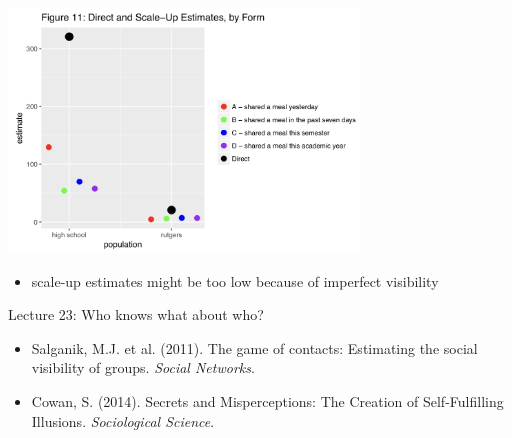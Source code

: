\documentclass[aspectratio=169]{beamer}
\begin{document}
\begin{frame}

\begin{center}
\includegraphics[width=0.7\textwidth]{figures/soc204_s2017_assignment8_estimates}
\end{center}

\begin{itemize}
\item scale-up estimates might be too low because of imperfect visibility
\end{itemize}


\end{frame}
\begin{frame}

Lecture 23: Who knows what about who?
\begin{itemize}
\item Salganik, M.J. et al. (2011). The game of contacts: Estimating the social visibility of groups. \textit{Social Networks}.
\item Cowan, S. (2014). Secrets and Misperceptions: The Creation of Self-Fulfilling Illusions. \textit{Sociological Science}.
\end{itemize}

\end{frame}
\end{document}

